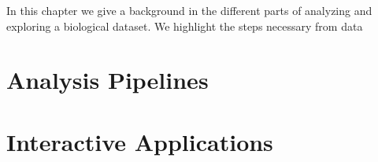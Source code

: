 In this chapter we give a background in the different parts of analyzing and
exploring a biological dataset. We highlight the steps necessary from data 

\section{Analysis Pipelines}

\section{Interactive Applications} 

